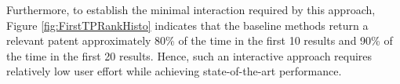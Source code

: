 Furthermore, to establish the minimal interaction required by this
approach, Figure \ref{fig:FirstTPRankHisto} indicates that the
baseline methods return a relevant patent approximately 80\% of the
time in the first 10 results and 90\% of the time in the first 20
results. Hence, such an interactive approach requires relatively low
user effort while achieving state-of-the-art performance.


%
%


